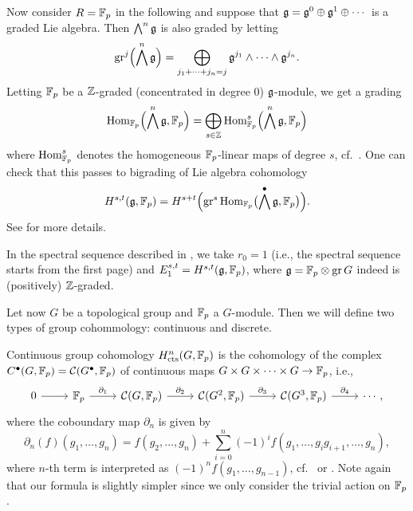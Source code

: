 Now consider $R=\mathbb{F}_{p}$ in the following and suppose that $\mathfrak{g} = \mathfrak{g}^0 \oplus \mathfrak{g}^1 \oplus \dotsb$ is a graded Lie algebra. Then $\bigwedge^n \mathfrak{g}$ is also graded by letting
\[
  \operatorname{gr}^j\Bigl( \bigwedge^n \mathfrak{g} \Bigr) = \bigoplus_{j_1+\dotsb+j_n = j} \mathfrak{g}^{j_1} \wedge \dotsb \wedge \mathfrak{g}^{j_n}.
\]
Letting $\mathbb{F}_{p}$ be a $\mathbb{Z}$-graded (concentrated in degree $0$) $\mathfrak{g}$-module, we get a grading
\[
  \operatorname{Hom}_{\mathbb{F}_{p}}\Bigl( \bigwedge^n \mathfrak{g}, \mathbb{F}_{p} \Bigr) = \bigoplus_{s \in \mathbb{Z}} \operatorname{Hom}_{\mathbb{F}_{p}}^s\Bigl( \bigwedge^n\mathfrak{g}, \mathbb{F}_{p} \Bigr)
\]
where $\operatorname{Hom}_{\mathbb{F}_{p}}^s$ denotes the homogeneous $\mathbb{F}_{p}$-linear maps of degree $s$, cf.\ \cite[Lem.~4.2]{Fossum}. One can check that this passes to bigrading of Lie algebra cohomology
\begin{equation*}
  H^{s,t}(\mathfrak{g}, \mathbb{F}_{p}) = H^{s+t}\Bigl( \operatorname{gr}^s \operatorname{Hom}_{\mathbb{F}_{p}}\bigl(\bigwedge^{\bullet} \mathfrak{g}, \mathbb{F}_{p} \bigr) \Bigr).
\end{equation*}%
%
See \cite[Chap.~1~§3]{Fuks} for more details.

In the spectral sequence described in \cite[§6.1]{Sor}, we take $r_{0} = 1$ (i.e., the spectral sequence starts from the first page) and $E_{1}^{s,t} = H^{s,t}(\mathfrak{g}, \mathbb{F}_{p})$, where $\mathfrak{g} = \mathbb{F}_{p} \otimes \operatorname{gr} G$ indeed is (positively) $\mathbb{Z}$-graded.

Let now $G$ be a topological group and $\mathbb{F}_{p}$ a $G$-module. Then we will define two types of group cohommology: continuous and discrete.

Continuous group cohomology $H_{\mathrm{cts}}^{n}(G,\mathbb{F}_{p})$ is the cohomology of the complex $C^{\bullet}(G,\mathbb{F}_{p}) = \mathcal{C}(G^{\bullet},\mathbb{F}_{p})$ of continuous maps $G \times G \times \dotsb \times G \to \mathbb{F}_{p}$, i.e.,
\[
  \begin{tikzcd}
    0 \ar[r] & \F_{p} \ar[r,"\partial_{1}"] & \Cont(G, \F_{p}) \ar[r,"\partial_{2}"] & \Cont(G^{2}, \F_{p}) \ar[r,"\partial_{3}"] &  \Cont(G^{3},\F_{p}) \ar[r,"\partial_{4}"] & \cdots,
  \end{tikzcd}
\]
where the coboundary map $\partial_{n}$ is given by
\begin{equation}\label{eq:group-coh-d}
  \partial_{n}(f)(g_{1},\dotsc,g_{n}) = f(g_{2},\dotsc,g_{n}) + \sum_{i=0}^{n}(-1)^{i}f(g_{1},\dotsc,g_{i}g_{i+1},\dotsc,g_{n}),
\end{equation}
where $n$-th term is interpreted as $(-1)^{n}f(g_{1},\dotsc,g_{n-1})$, cf.\ \cite[§3]{Sor} or \cite[§2]{GalCoh}. Note again that our formula is slightly simpler since we only consider the trivial action on $\mathbb{F}_{p}$.

